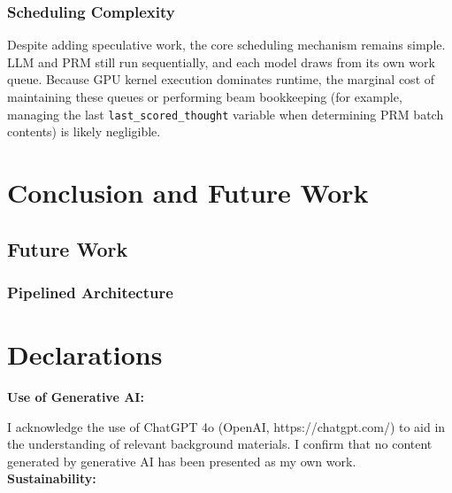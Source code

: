 \documentclass[11pt,twoside]{report}
\begin{document}

\subsection{Scheduling Complexity}
Despite adding speculative work, the core scheduling mechanism remains simple. 
LLM and PRM still run sequentially, and each model draws from its own work queue. 
Because GPU kernel execution dominates runtime, the marginal cost of maintaining these queues or performing beam bookkeeping (for example, managing the last \texttt{last\_scored\_thought} variable when determining PRM batch contents) is likely negligible. 


\chapter{Conclusion and Future Work}

\section{Future Work}
\subsection{Pipelined Architecture}





\chapter{Declarations}
\textbf{Use of Generative AI:} 

I acknowledge the use of ChatGPT 4o (OpenAI, https://chatgpt.com/) to aid in the understanding of relevant background materials. 
I confirm that no content generated by generative AI has been presented as my own work. \\

\textbf{Sustainability:} 
\end{document}
